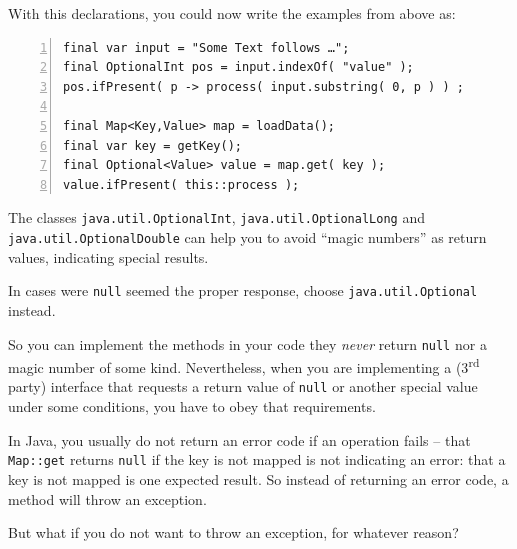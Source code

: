 \documentclass[11pt,a4paper, titlepage, parskip=half, headsepline, footsepline, cleardoublepage=current, headheight=1cm]{scrbook}
\begin{document}
With this declarations, you could now write the examples from above as:
\begin{lstlisting}[numbers=left]
final var input = "Some Text follows …";
final OptionalInt pos = input.indexOf( "value" );
pos.ifPresent( p -> process( input.substring( 0, p ) ) ;

final Map<Key,Value> map = loadData();
final var key = getKey();
final Optional<Value> value = map.get( key );
value.ifPresent( this::process );
\end{lstlisting}

The classes \lstinline|java.util.OptionalInt|\autocite{ORACLE_DOC_OPTIONALINT_CLASS}, \lstinline|java.util.OptionalLong|\autocite{ORACLE_DOC_OPTIONALLONG_CLASS} and \lstinline|java.util.OptionalDouble|\autocite{ORACLE_DOC_OPTIONALDOUBLE_CLASS} can help you to avoid “magic numbers” as return values, indicating special results.

In cases were \lstinline|null| seemed the proper response, choose \lstinline|java.util.Optional|\autocite{ORACLE_DOC_OPTIONAL_CLASS} instead.

So you can implement the methods in your code they \textit{never} return \lstinline|null| nor a magic number of some kind. Nevertheless, when you are implementing a (3\textsuperscript{rd} party) interface that requests a return value of \lstinline|null| or another special value under some conditions, you have to obey that requirements.

In Java, you usually do not return an error code if an operation fails – that \lstinline|Map::get| returns \lstinline|null| if the key is not mapped is not indicating an error: that a key is not mapped is one expected result. So instead of returning an error code, a method will throw an exception.

But what if you do not want to throw an exception, for whatever reason?
\end{document}
